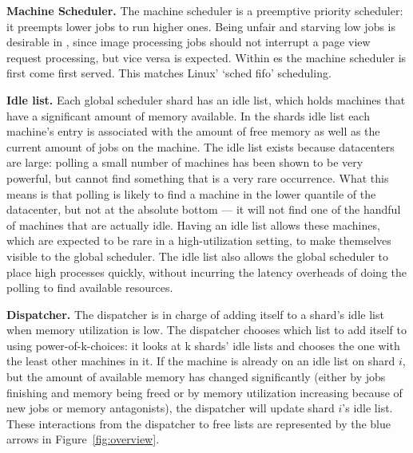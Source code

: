 \textbf{Machine Scheduler.}
The machine scheduler is a preemptive priority scheduler: it preempts lower
\class{} jobs to run higher \class{} ones. Being unfair and starving low
\class{} jobs is desirable in \sys{}, since image processing jobs should not
interrupt a page view request processing, but vice versa is expected. Within
\class{}es the machine scheduler is first come first served. This matches Linux'
`sched fifo' scheduling.


\textbf{Idle list.}
Each global scheduler shard has an idle list, which holds machines that
have a significant amount of memory available. In the shards idle list each
machine's entry is associated with the amount of free memory as well as the
current amount of jobs on the machine. The idle list exists because datacenters
are large: polling a small number of machines has been shown to be very
powerful, but cannot find something that is a very rare occurrence.
What this means is that polling is likely to find a machine in the lower
quantile of the datacenter, but not at the absolute bottom --- it will not find
one of the handful of machines that are actually idle. Having an idle list
allows these machines, which are expected to be rare in a high-utilization
setting, to make themselves visible to the global scheduler. The idle list also
allows the global scheduler to place high \class{} processes quickly, without
incurring the latency overheads of doing the polling to find available
resources.


\textbf{Dispatcher.}
The dispatcher is in charge of adding itself to a shard's idle list when memory
utilization is low. The dispatcher chooses which list to add itself to using
power-of-k-choices: it looks at k shards' idle lists and chooses the one with
the least other machines in it. If the machine is already on an idle list on
shard $i$, but the amount of available memory has changed significantly (either
by jobs finishing and memory being freed or by memory utilization increasing
because of new jobs or memory antagonists), the dispatcher will update shard
$i$'s idle list. These interactions from the dispatcher to free lists are
represented by the blue arrows in Figure~\ref{fig:overview}.

